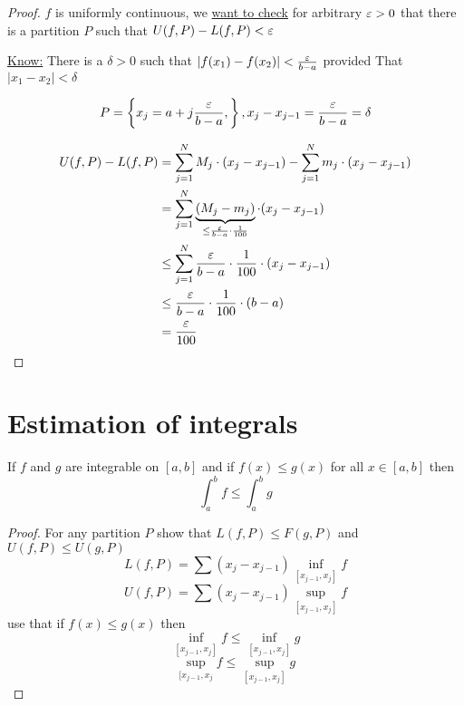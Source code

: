\begin{proof}
  $f$ is uniformly continuous, we \underline{want to check} for arbitrary $\varepsilon > 0$
  that there is a partition $P$ such that $U(f, P) - L(f, P) < \varepsilon$

  \underline{Know:} There is a $\delta > 0$ such that $|f(x_1) - f(x_2)| < \frac{\varepsilon}{b-a}$ provided That $|x_1 - x_2| < \delta$

  $$P = \left\{x_j = a + j\frac{\varepsilon}{b-a},\right\}, x_j-x_{j-1} = \frac{\varepsilon}{b-a} = \delta$$

  \begin{align*}
    U(f, P) - L(f, P) &= \sum_{j=1}^{N} M_j \cdot (x_j - x_{j-1}) - \sum_{j=1}^{N} m_j \cdot (x_j - x_{j-1})\\
    &= \sum_{j=1}^{N} \underbrace{(M_j - m_j)}_{\leq \frac{\varepsilon}{b-a}\cdot \frac{1}{100}} \cdot (x_j - x_{j-1})\\
    &\leq \sum_{j=1}^{N} \frac{\varepsilon}{b-a}\cdot \frac{1}{100} \cdot (x_j - x_{j-1})\\
    &\leq \frac{\varepsilon}{b-a}\cdot \frac{1}{100} \cdot (b-a)\\
    &= \frac{\varepsilon}{100}
  \end{align*}
\end{proof}

\section{Estimation of integrals}

\begin{theorem*}
  If $f$ and $g$ are integrable on $[a, b]$ and if $f(x) \le g(x)$ for all $x \in [a, b]$ then
  $$\int_a^b f \le \int_a^b g$$
\end{theorem*}

\begin{proof}
  For any partition $P$ show that $L(f, P) \le F(g, P)$ and $U(f, P) \le U(g, P)$
  $$L(f, P) = \sum (x_j - x_{j-1}) \inf_{[x_{j-1}, x_j]} f$$
  $$U(f, P) = \sum (x_j - x_{j-1}) \sup_{[x_{j-1}, x_j]} f$$
  use that if $f(x) \le g(x)$ then 
  $$\inf_{[x_{j-1}, x_j]} f \le \inf_{[x_{j-1}, x_j]} g$$
  $$\sup_{[x_{j-1}, x_j} f \le \sup_{[x_{j-1}, x_j]} g$$
\end{proof}




